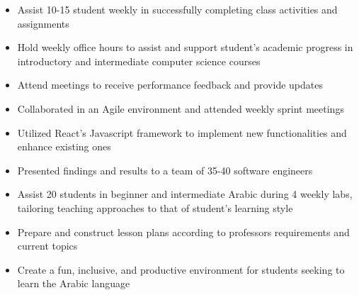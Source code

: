 {}
\begin{itemize}
    \item Assist 10-15  student weekly in successfully completing class
          activities and \\ assignments
    \item Hold weekly office hours to assist and support student’s academic
          progress in introductory and intermediate computer science courses
    \item Attend meetings to receive performance feedback and provide updates
\end{itemize}
\smallskip
{}
\begin{itemize}
    \item Collaborated in an Agile environment and attended weekly sprint meetings
    \item Utilized React’s Javascript framework to implement new functionalities
          and \\ enhance existing ones
    \item Presented findings and results to a team of 35-40 software engineers
\end{itemize}
\smallskip
{}
\begin{itemize}
    \item Assist 20 students in beginner and intermediate Arabic during 4 weekly
          labs, tailoring teaching approaches to that of student’s learning style
    \item Prepare and construct lesson plans according to professors requirements and current topics
    \item Create a fun, inclusive, and productive environment for students seeking to learn the Arabic language
\end{itemize}
\smallskip
{}

